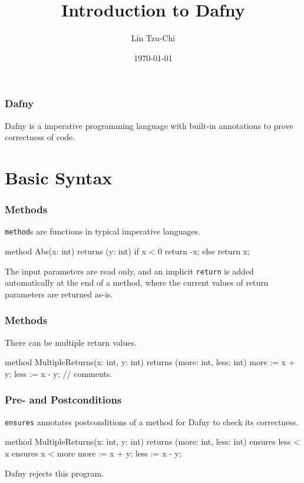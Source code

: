 \documentclass[10pt, compress]{beamer}
\title{Introduction to Dafny}
\subtitle{}
\date{\today}
\author{Lin Tzu-Chi}
\begin{document}
\maketitle

\begin{frame}[fragile]
  \frametitle{Dafny}

  Dafny is a imperative programming language with built-in annotations to prove correctness of code.
  
\end{frame}

\section{Basic Syntax}

\begin{frame}[fragile]
  \frametitle{Methods}
  
  \verb|method|s are functions in typical imperative languages.
  
  \begin{verbnobox}[\footnotesize]
  method Abs(x: int) returns (y: int)
  {
    if x < 0
      { return -x; }
    else
      { return x; }
  }
  \end{verbnobox}
  The input parameters are read only, and an implicit \verb|return| is added automatically at the end of a method, where the current values of return parameters are returned as-is.
\end{frame}

\begin{frame}[fragile]
  \frametitle{Methods}
  
  There can be multiple return values.
  \begin{verbnobox}[\footnotesize]
method MultipleReturns(x: int, y: int)
returns (more: int, less: int)
{
  more := x + y;
  less := x - y;
  // comments.
}
  \end{verbnobox}
\end{frame}

\begin{frame}[fragile]
  \frametitle{Pre- and Postconditions}
  \verb|ensures| annotates postconditions of a method for Dafny to check its correctness. 
  \begin{verbnobox}[\footnotesize]
method MultipleReturns(x: int, y: int)
returns (more: int, less: int)
  ensures less < x
  ensures x < more
{
    more := x + y;
    less := x - y;
}
  \end{verbnobox}	
  
Dafny rejects this program.
\end{frame}
\end{document}
